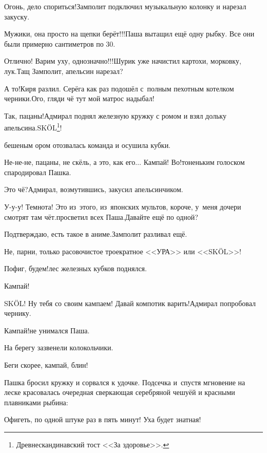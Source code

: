 \diagdash Огонь, дело спориться!\mdash Замполит подключил музыкальную колонку и нарезал закуску.

\diagdash Мужики, она просто на щепки берёт!!!\mdash Паша вытащил ещё одну рыбку. Все они были примерно сантиметров по 30.

\diagdash Отлично! Варим уху, однозначно!!!\mdash Шурик уже начистил картохи, морковку, лук.\mdash Тащ Замполит, апельсин нарезал?

\diagdash А то!\mdash Киря разлил. Серёга как раз подошёл с~полным пехотным котелком черники.\mdash Ого, гляди чё тут мой матрос надыбал!

\renewcommand*{\thefootnote}{\fnsymbol{footnote}}
\setcounter{footnote}{0}
\diagdash Так, пацаны!\mdash Адмирал поднял железную кружку с ромом и взял дольку апельсина.\mdash SK{\"O}L{\footnote{Древнескандинавский тост <<За здоровье>>.}}!

\mdash бешеным ором отозвалась команда и осушила кубки.

\diagdash Не-не-не, пацаны, не скёль, а это, как его$\ldots$ Кампай! Во!\mdash тоненьким голоском спародировал Пашка. 

\diagdash Это чё?\mdash Адмирал, возмутившись, закусил апельсинчиком.

\diagdash У-у-у! Темнота! Это из~этого, из~японских мультов, короче, у~меня дочери смотрят там чёт.\mdash просветил всех Паша.\mdash Давайте ещё по одной?

\diagdash Подтверждаю, есть такое в аниме.\mdash Замполит разливал ещё.

\diagdash Не, парни, только расово\sdash чистое троекратное <<УРА>> или <<SK{\"O}L>>! 

\diagdash Пофиг, будем!\mdash лес железных кубков поднялся.

\diagdash Кампай!

\diagdash SK{\"O}L! Ну тебя со своим кампаем! Давай компотик варить!\mdash Адмирал попробовал чернику.

\diagdash Кампай!\mdash не унимался Паша.

На берегу зазвенели колокольчики.

\diagdash Беги скорее, кампай, блин!

Пашка бросил кружку и сорвался к удочке. Подсечка и~спустя мгновение на леске красовалась очередная сверкающая серебряной чешуёй и красными плавниками рыбина:

\diagdash Офигеть, по одной штуке раз в пять минут! Уха будет знатная!

